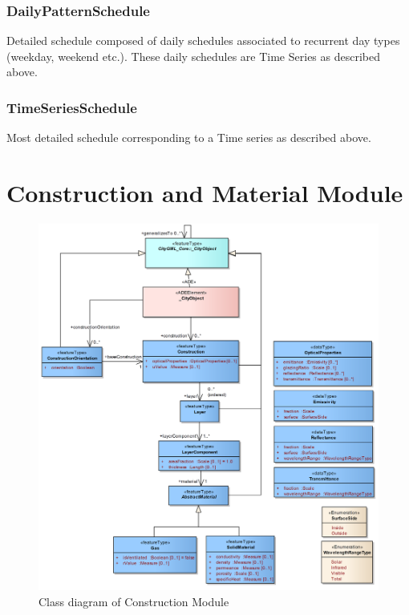 \documentclass[a4paper,12pt]{article}
\let\stdsection\section%
\renewcommand\section{\newpage\stdsection}
\begin{document}
\subsubsection{DailyPatternSchedule}\label{dailypatternschedule}

Detailed schedule composed of daily schedules associated to recurrent
day types (weekday, weekend etc.). These daily schedules are Time Series
as described above.

\subsubsection{TimeSeriesSchedule}\label{timeseriesschedule}

Most detailed schedule corresponding to a Time series as described
above.

\section{Construction and Material
Module}\label{construction-and-material-module}

\begin{figure}[htbp]
\centering
\includegraphics{fig/class_construction.png}
\caption{Class diagram of Construction Module}
\end{figure}
\end{document}
